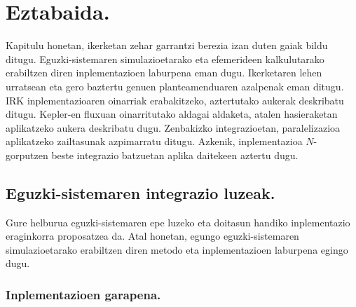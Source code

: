 \chapter{Eztabaida.}


Kapitulu honetan, ikerketan zehar garrantzi berezia izan duten gaiak bildu ditugu. Eguzki-sistemaren simulazioetarako eta efemerideen kalkulutarako erabiltzen diren inplementazioen laburpena eman dugu. Ikerketaren lehen urratsean eta gero baztertu genuen planteamenduaren azalpenak eman ditugu. IRK inplementazioaren oinarriak erabakitzeko, aztertutako aukerak deskribatu ditugu. Kepler-en fluxuan oinarritutako aldagai aldaketa, atalen hasieraketan aplikatzeko aukera deskribatu dugu. Zenbakizko integrazioetan, paralelizazioa aplikatzeko zailtasunak azpimarratu ditugu. Azkenik, inplementazioa $N$-gorputzen beste integrazio batzuetan aplika daitekeen aztertu dugu.   


\section{Eguzki-sistemaren integrazio luzeak.}


Gure helburua eguzki-sistemaren epe luzeko eta doitasun handiko inplementazio eraginkorra proposatzea da. Atal honetan, egungo eguzki-sistemaren simulazioetarako erabiltzen diren metodo eta inplementazioen laburpena egingo dugu. 

\subsection*{Inplementazioen garapena.} 

